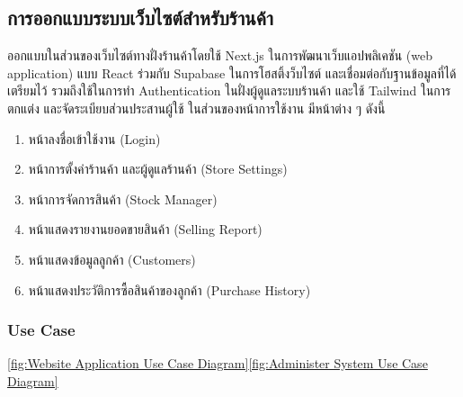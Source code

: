 \subsection{การออกแบบระบบเว็บไซต์สำหรับร้านค้า}
ออกแบบในส่วนของเว็บไซต์ทางฝั่งร้านค้าโดยใช้ Next.js ในการพัฒนาเว็บแอปพลิเคชัน (web application) แบบ React ร่วมกับ Supabase ในการโฮสติ้งว็บไซต์ และเชื่อมต่อกับฐานข้อมูลที่ได้เตรียมไว้ รวมถึงใช้ในการทำ Authentication ในฝั่งผู้ดูแลระบบร้านค้า และใช้ Tailwind ในการตกแต่ง และจัดระเบียบส่วนประสานผู้ใช้ ในส่วนของหน้าการใช้งาน มีหน้าต่าง ๆ ดังนี้
\begin{enumerate}
  \item หน้าลงชื่อเข้าใช้งาน (Login)
  \item หน้าการตั้งค่าร้านค้า และผู้ดูแลร้านค้า (Store Settings)
  \item หน้าการจัดการสินค้า (Stock Manager)
  \item หน้าแสดงรายงานยอดขายสินค้า (Selling Report)
  \item หน้าแสดงข้อมูลลูกค้า (Customers)
  \item หน้าแสดงประวัติการซื้อสินค้าของลูกค้า (Purchase History)

\end{enumerate}

\subsubsection{Use Case}\ref{fig:Website Application Use Case Diagram}\ref{fig:Administer System Use Case Diagram}

